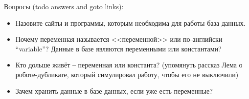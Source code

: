 Вопросы (todo answers and goto links): 
\begin{itemize}
    \item Назовите сайты и программы, которым необходима для работы база данных.
    \item Почему переменная называется <<переменной>> или по-английски ``variable''? 
        Данные в базе являются переменными или константами?
    \item Кто дольше живёт ‒ переменная или константа? (упомянуть рассказ Лема о роботе-дубликате, 
    который симулировал работу, чтобы его не выключили)
    \item Зачем хранить данные в базе данных, если уже есть переменные?
\end{itemize}
